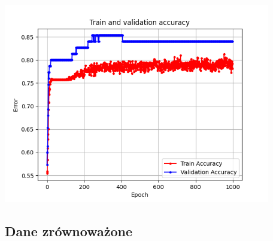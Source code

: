 \documentclass[11pt, a4paper, notitlepage]{report}
\begin{document}
\begin{center}
\includegraphics[width=330pt]{graphics/NeuralNetwork_1}

\end{center}

\subsection{Dane zrównoważone}
\end{document}
